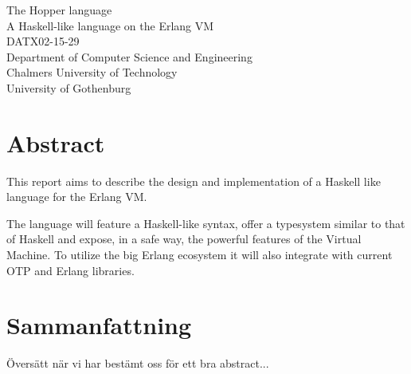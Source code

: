 The Hopper language\\
A Haskell-like language on the Erlang VM\\
DATX02-15-29\\
Department of Computer Science and Engineering\\
Chalmers University of Technology\\
University of Gothenburg\\

\thispagestyle{plain}			%
\section*{Abstract}

This report aims to describe the design and implementation of a Haskell like language for the Erlang VM.

The language will feature a Haskell-like syntax, offer a typesystem
similar to that of Haskell and expose, in a safe way, the powerful features of
the Virtual Machine. To utilize the big Erlang ecosystem it will also integrate
with current OTP and Erlang libraries.



\section*{Sammanfattning}
Översätt när vi har bestämt oss för ett bra abstract...



\newpage				%
\thispagestyle{empty}
\mbox{}
